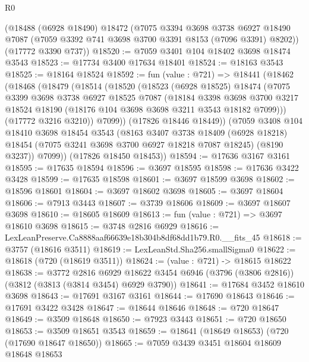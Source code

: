 \begin{lexlean}{R0}
\begin{coremodule}
    (@18488
      (@6928 @18490)
      @18472
      (@7075
        @3394
        @3698
        @3738
        @6927
        @18490
        @7087
        (@7059 @3392 @741 @3698 @3700 @3391 @8153 (@7096 @3391) @8202))
      (@17772 @3390 @737))
@18520 := @7059 @3401 @104 @18402 @3698 @18474 @3543
@18523 := @17734 @3400 @17634 @18401
@18524 := @18163 @3543
@18525 := @18164 @18524
@18592 := fun (value : @721) =>
  @18441
    (@18462
      (@18468
        (@18479
          (@18514
            (@18520
              (@18523
                (@6928 @18525)
                @18474
                (@7075
                  @3399
                  @3698
                  @3738
                  @6927
                  @18525
                  @7087
                  (@18184
                    @3398
                    @3698
                    @3700
                    @3217
                    @18524
                    @18190
                    (@18176 @104 @3698 @3698 @3211 @3543 @18182 @7099)))
                (@17772 @3216 @3210))
              @7099))
          (@17826 @18446 @18449))
        (@7059
          @3408
          @104
          @18410
          @3698
          @18454
          @3543
          (@8163
            @3407
            @3738
            @18409
            (@6928 @18218)
            @18454
            (@7075 @3241 @3698 @3700 @6927 @18218 @7087 @18245)
            (@8190 @3237))
          @7099))
      (@17826 @18450 @18453))
@18594 := @17636 @3167 @3161
@18595 := @17635 @18594
@18596 := @3697 @18595
@18598 := @17636 @3422 @3428
@18599 := @17635 @18598
@18601 := @3697 @18599 @3698
@18602 := @18596 @18601
@18604 := @3697 @18602 @3698
@18605 := @3697 @18604
@18606 := @7913 @3443
@18607 := @3739 @18606
@18609 := @3697 @18607 @3698
@18610 := @18605 @18609
@18613 := fun (value : @721) => @3697 @18610 @3698
@18615 := @3748 @2816 @6929
@18616 := LexLeanPreserve.Ca8888aaf66639e18b304b8df68dd1b79.R0.__fits_45
@18618 := @3757 (@18616 @3511)
@18619 := LexLeanStd.Sha256.smallSigma0
@18622 := @18618 (@720 (@18619 @3511))
@18624 := (value : @721) -> @18615 @18622
@18638 := @3772
    @2816
    @6929
    @18622
    @3454
    @6946
    (@3796 (@3806 @2816))
    (@3812 (@3813 (@3814 @3454) @6929 @3790))
@18641 := @17684 @3452 @18610 @3698
@18643 := @17691 @3167 @3161
@18644 := @17690 @18643
@18646 := @17691 @3422 @3428
@18647 := @18644 @18646
@18648 := @720 @18647
@18649 := @3509 @18648
@18650 := @7923 @3443
@18651 := @720 @18650
@18653 := @3509 @18651 @3543
@18659 := @18641 (@18649 @18653) (@720 (@17690 @18647 @18650))
@18665 := @7059 @3439 @3451 @18604 @18609 @18648 @18653

\end{coremodule}
\end{lexlean}
